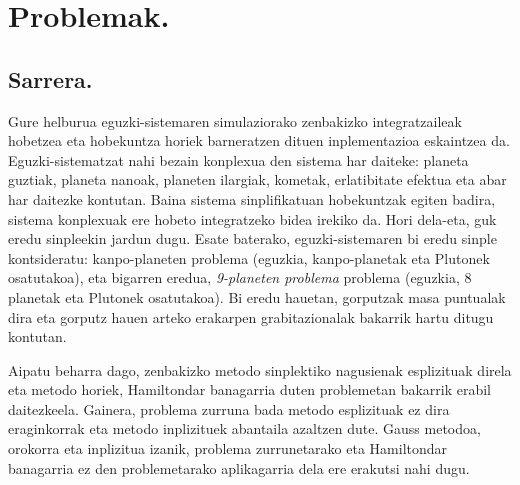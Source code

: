 \chapter{Problemak.}

\section{Sarrera.}



Gure helburua eguzki-sistemaren simulaziorako zenbakizko integratzaileak hobetzea eta hobekuntza horiek barneratzen dituen inplementazioa eskaintzea da. Eguzki-sistematzat nahi bezain konplexua den sistema har daiteke: planeta guztiak, planeta nanoak, planeten ilargiak, kometak, erlatibitate efektua eta abar har daitezke kontutan. Baina sistema sinplifikatuan hobekuntzak egiten badira, sistema konplexuak ere hobeto integratzeko bidea irekiko da. Hori dela-eta, guk eredu sinpleekin jardun dugu. Esate baterako, eguzki-sistemaren bi eredu sinple kontsideratu: kanpo-planeten problema (eguzkia, kanpo-planetak eta Plutonek osatutakoa), eta bigarren eredua, \emph{9-planeten problema}  problema (eguzkia, 8 planetak eta Plutonek osatutakoa).  Bi eredu hauetan, gorputzak masa puntualak dira eta gorputz hauen arteko erakarpen grabitazionalak bakarrik hartu ditugu kontutan.

Aipatu beharra dago, zenbakizko metodo sinplektiko nagusienak esplizituak direla eta metodo horiek, Hamiltondar banagarria duten problemetan bakarrik erabil daitezkeela. Gainera, problema zurruna bada metodo esplizituak ez dira eraginkorrak eta metodo inplizituek abantaila azaltzen dute. Gauss metodoa, orokorra  eta inplizitua izanik, problema zurrunetarako eta Hamiltondar banagarria ez den problemetarako  aplikagarria dela ere erakutsi nahi dugu. 
 
